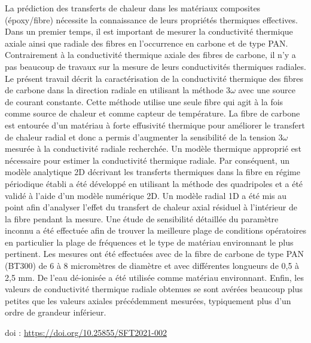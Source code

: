 {\normalsize
La prédiction des transferts de chaleur dans les matériaux composites (époxy/fibre) nécessite la connaissance de leurs propriétés thermiques effectives. Dans un premier temps, il est important de mesurer la conductivité thermique axiale ainsi que radiale des fibres en l'occurrence en carbone et de type PAN. Contrairement à la conductivité thermique axiale des fibres de carbone, il n'y a pas beaucoup de travaux sur la mesure de leurs conductivités thermiques radiales. Le présent travail décrit la caractérisation de la conductivité thermique des fibres de carbone dans la direction radiale en utilisant la méthode 3$\omega$ avec une source de courant constante. Cette méthode utilise une seule fibre qui agit à la fois comme source de chaleur et comme capteur de température. La fibre de carbone est entourée d'un matériau à forte effusivité thermique pour améliorer le transfert de chaleur radial et donc a permis d'augmenter la sensibilité de la tension 3$\omega$ mesurée à la conductivité radiale recherchée. Un modèle thermique approprié est nécessaire pour estimer la conductivité thermique radiale. Par conséquent, un modèle analytique 2D décrivant les transferts thermiques dans la fibre en régime périodique établi a été développé en utilisant la méthode des quadripoles et a été validé à l'aide d'un modèle numérique 2D. Un modèle radial 1D a été mis au point afin d'analyser l'effet du transfert de chaleur axial résiduel à l'intérieur de la fibre pendant la mesure. Une étude de sensibilité détaillée du paramètre inconnu a été effectuée afin de trouver la meilleure plage de conditions opératoires en particulier la plage de fréquences et le type de matériau environnant le plus pertinent. Les mesures ont été effectuées avec de la fibre de carbone de type PAN (BT300) de 6 à 8 micromètres de diamètre et avec différentes longueurs de 0,5 à 2,5 mm. De l'eau dé-ionisée a été utilisée comme matériau environnant. Enfin, les valeurs de conductivité thermique radiale obtenues se sont avérées beaucoup plus petites que les valeurs axiales précédemment mesurées, typiquement plus d'un ordre de grandeur inférieur.

 \vfill doi : \url{https://doi.org/10.25855/SFT2021-002}

}
 
